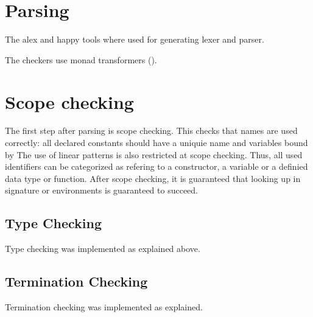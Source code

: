 \section{Parsing}
The alex \cite{alex} and happy \cite{happy} tools where used for generating lexer and parser.

The checkers use monad transformers (\cite{Grabmueller2006MonadTransformers}).

\section{Scope checking}
The first step after parsing is scope checking. This checks that names are used correctly:
all declared constants should have a uniquie name and variables bound by 
The use of linear patterns is also restricted at scope checking.
Thus, all used identifiers can be categorized as refering to a constructor, a variable or a definied data type or
function.
After scope checking, it is guaranteed that looking up in signature or environments is guaranteed to succeed.
\subsection{Type Checking}
Type checking was implemented as explained above.
\subsection{Termination Checking}
Termination checking was implemented as explained.